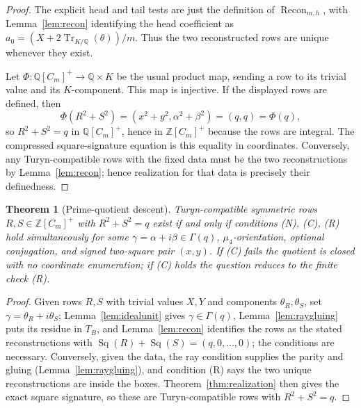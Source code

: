 \documentclass[11pt]{article}
\theoremstyle{plain}
\newtheorem{theorem}{Theorem}[section]
\theoremstyle{definition}
\theoremstyle{remark}
\newcommand{\Z}{\mathbb Z}
\newcommand{\Q}{\mathbb Q}
\newcommand{\Tr}{\operatorname{Tr}}
\newcommand{\Recon}{\operatorname{Recon}}
\newcommand{\Sq}{\operatorname{Sq}}
\begin{document}
\begin{proof}
The explicit head and tail tests are just the definition of
$\Recon_{m,h}$, with Lemma~\ref{lem:recon} identifying the head coefficient as
$a_0=(X+2\Tr_{K/\Q}(\theta))/m$. Thus the two reconstructed rows are unique
whenever they exist.

Let $\Phi:\Q[C_m]^+\to\Q\times K$ be the usual product map, sending a row to its
trivial value and its $K$-component. This map is injective. If the displayed
rows are defined, then
\[
  \Phi(R^2+S^2)=(x^2+y^2,\alpha^2+\beta^2)=(q,q)=\Phi(q),
\]
so $R^2+S^2=q$ in $\Q[C_m]^+$, hence in $\Z[C_m]^+$ because the rows are
integral. The compressed square-signature equation is this equality in
coordinates. Conversely, any Turyn-compatible rows with the fixed data must be
the two reconstructions by Lemma~\ref{lem:recon}; hence realization for that
data is precisely their definedness.
\end{proof}

\begin{theorem}[Prime-quotient descent]\label{thm:descent}
Turyn-compatible symmetric rows $R,S\in\Z[C_m]^+$ with $R^2+S^2=q$ exist if and
only if conditions \emph{(N)}, \emph{(C)}, \emph{(R)} hold simultaneously for
some $\gamma=\alpha+i\beta\in\Gamma(q)$, $\mu_4$-orientation, optional
conjugation, and signed two-square pair $(x,y)$. If \emph{(C)} fails the
quotient is closed with no coordinate enumeration; if \emph{(C)} holds the
question reduces to the finite check \emph{(R)}.
\end{theorem}

\begin{proof}
Given rows $R,S$ with trivial values $X,Y$ and components $\theta_R,\theta_S$,
set $\gamma=\theta_R+i\theta_S$; Lemma~\ref{lem:idealunit} gives
$\gamma\in\Gamma(q)$, Lemma~\ref{lem:raygluing} puts its residue in $T_B$, and
Lemma~\ref{lem:recon} identifies the rows as the stated reconstructions with
$\Sq(R)+\Sq(S)=(q,0,\dots,0)$; the conditions are necessary. Conversely, given
the data, the ray condition supplies the parity and gluing
(Lemma~\ref{lem:raygluing}), and condition (R) says the two unique
reconstructions are inside the boxes. Theorem~\ref{thm:realization} then gives
the exact square signature, so these are Turyn-compatible rows with
$R^2+S^2=q$.
\end{proof}
\end{document}
